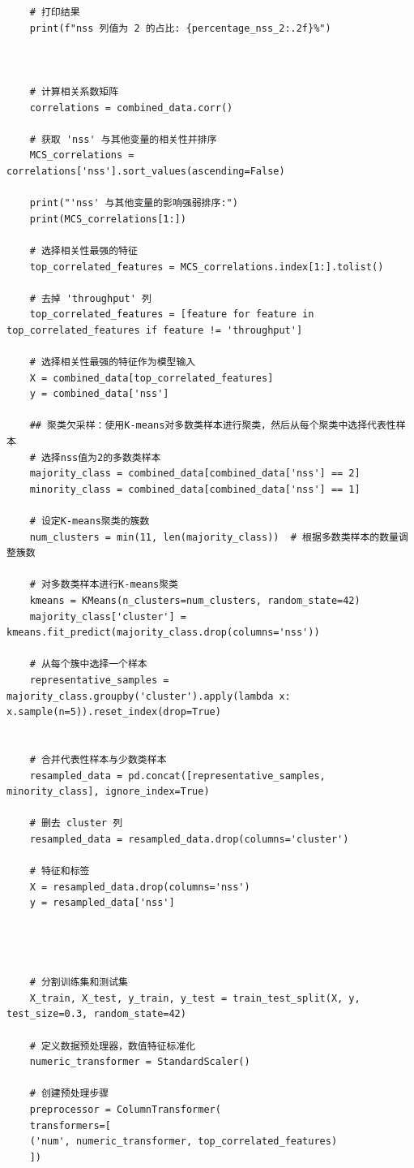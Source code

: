 \documentclass[bwprint]{gmcmthesis}
\begin{document}
\begin{lstlisting}
	# 打印结果
	print(f"nss 列值为 2 的占比: {percentage_nss_2:.2f}%")
	
	
	
	# 计算相关系数矩阵
	correlations = combined_data.corr()
	
	# 获取 'nss' 与其他变量的相关性并排序
	MCS_correlations = correlations['nss'].sort_values(ascending=False)
	
	print("'nss' 与其他变量的影响强弱排序:")
	print(MCS_correlations[1:])
	
	# 选择相关性最强的特征
	top_correlated_features = MCS_correlations.index[1:].tolist()
	
	# 去掉 'throughput' 列
	top_correlated_features = [feature for feature in top_correlated_features if feature != 'throughput']
	
	# 选择相关性最强的特征作为模型输入
	X = combined_data[top_correlated_features]
	y = combined_data['nss']
	
	## 聚类欠采样：使用K-means对多数类样本进行聚类，然后从每个聚类中选择代表性样本
	# 选择nss值为2的多数类样本
	majority_class = combined_data[combined_data['nss'] == 2]
	minority_class = combined_data[combined_data['nss'] == 1]
	
	# 设定K-means聚类的簇数
	num_clusters = min(11, len(majority_class))  # 根据多数类样本的数量调整簇数
	
	# 对多数类样本进行K-means聚类
	kmeans = KMeans(n_clusters=num_clusters, random_state=42)
	majority_class['cluster'] = kmeans.fit_predict(majority_class.drop(columns='nss'))
	
	# 从每个簇中选择一个样本
	representative_samples = majority_class.groupby('cluster').apply(lambda x: x.sample(n=5)).reset_index(drop=True)
	
	
	# 合并代表性样本与少数类样本
	resampled_data = pd.concat([representative_samples, minority_class], ignore_index=True)
	
	# 删去 cluster 列
	resampled_data = resampled_data.drop(columns='cluster')
	
	# 特征和标签
	X = resampled_data.drop(columns='nss')
	y = resampled_data['nss']
	
	
	
	
	# 分割训练集和测试集
	X_train, X_test, y_train, y_test = train_test_split(X, y, test_size=0.3, random_state=42)
	
	# 定义数据预处理器，数值特征标准化
	numeric_transformer = StandardScaler()
	
	# 创建预处理步骤
	preprocessor = ColumnTransformer(
	transformers=[
	('num', numeric_transformer, top_correlated_features)
	])
	

\end{lstlisting}
\end{document}
